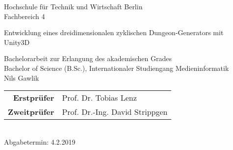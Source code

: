 
\pagestyle{empty} %

\clearscrheadings\clearscrplain


\begin{center} 
\begin{large}
Hochschule für Technik und Wirtschaft Berlin\\
Fachbereich 4
\end{large}

\vspace{8mm}
\begin{Huge}
Entwicklung eines dreidimensionalen zyklischen Dungeon-Generators mit Unity3D\\
\end{Huge}
\vspace{8mm}
Bachelorarbeit zur Erlangung des akademischen Grades\\
Bachelor of Science (B.Sc.), Internationaler Studiengang Medieninformatik\\
\vspace{1.4 cm}
Nils Gawlik\\
\vspace{8cm}
\begin{tabular}{rl}
{\bfseries Erstprüfer}& Prof. Dr. Tobias Lenz \\
{\bfseries Zweitprüfer}& Prof. Dr.-Ing. David Strippgen \\
\end{tabular}\\
\vspace{.3cm}
Abgabetermin: 4.2.2019\\

\end{center}
\clearpage


\pagestyle{useheadings} %

\tableofcontents %
\listoffigures %
\clearpage

